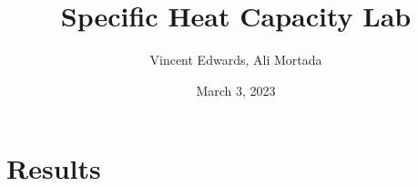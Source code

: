 \documentclass[12pt]{article} %
\title{Specific Heat Capacity Lab}
\author{Vincent Edwards, Ali Mortada}
\date{March 3, 2023}
\begin{document}
\maketitle
\newpage

\section{Results}
\end{document}
